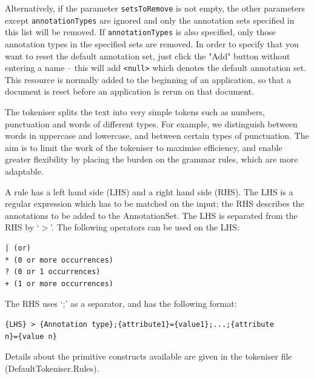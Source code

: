 Alternatively, if the parameter \texttt{setsToRemove} is not empty, 
the other parameters except \texttt{annotationTypes}  are ignored 
and only the annotation sets 
specified in this list will be removed. If \texttt{annotationTypes} is also
specified, only those annotation types in the specified sets are removed. 
In order to specify that you want to reset the default
annotation set, just click the "Add" button without entering a name --
this will add \verb|<null>| which denotes the default annotation set.
This resource is normally added to the beginning of an application, so
that a document is reset before an application is rerun on that document.




The tokeniser splits the text into very simple tokens such as numbers,
punctuation and words of different types. For example, we distinguish
between words in uppercase and lowercase, and between certain types of
punctuation. The aim is to limit the work of the tokeniser to maximise efficiency, and
enable greater flexibility by placing the burden on the grammar rules,
which are more adaptable.

A rule has a left hand side (LHS) and a right hand side (RHS).
The LHS is a regular expression which has to be matched on the input;
the RHS describes the annotations to be added to the AnnotationSet.
The LHS is separated from the RHS by `$>$'.
The following operators can be used on the LHS:
\begin{small}
\begin{verbatim}
| (or)
* (0 or more occurrences)
? (0 or 1 occurrences)
+ (1 or more occurrences)
\end{verbatim}
\end{small}

\noindent
The RHS uses `;' as a separator, and has the following format:
\begin{small}
\begin{verbatim}
{LHS} > {Annotation type};{attribute1}={value1};...;{attribute
n}={value n}
\end{verbatim}
\end{small}

\noindent
Details about the primitive constructs available are given in the
tokeniser file (DefaultTokeniser.Rules).\\


